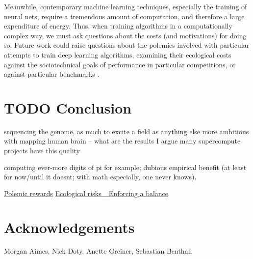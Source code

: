 \documentclass[sigconf]{acmart}
\begin{document}
Meanwhile, contemporary machine learning techniques, especially the training of neural nets, 
require a tremendous amount of computation, and therefore a large expenditure of energy.
Thus, when training algorithms in a computationally complex way,
we must ask questions about the costs (and motivations) for doing so.
Future work could raise questions about the polemics involved
with particular attempts to train deep learning algorithms,
examining their ecological costs against the sociotechnical goals 
of performance in particular competitions, or against particular benchmarks \cite{SixSilberman2015}.


\section{{\bfseries\sffamily TODO} Conclusion}
\label{sec:org9a0071a}

sequencing the genome, as much to excite a field as anything else
more ambitious with mapping human brain -- what are the results
I argue many supercompute projects have this quality

computing ever-more digits of pi for example; dubious empirical benefit (at least for now/until it doesnt; with math especially, one never knows).

\uline{Polemic rewards}
\uline{Ecological risks
\_Enforcing a balance}


\section{Acknowledgements}
\label{sec:org8d3d2b1}
Morgan Aimes, Nick Doty, Anette Greiner, Sebastian Benthall



\end{document}
